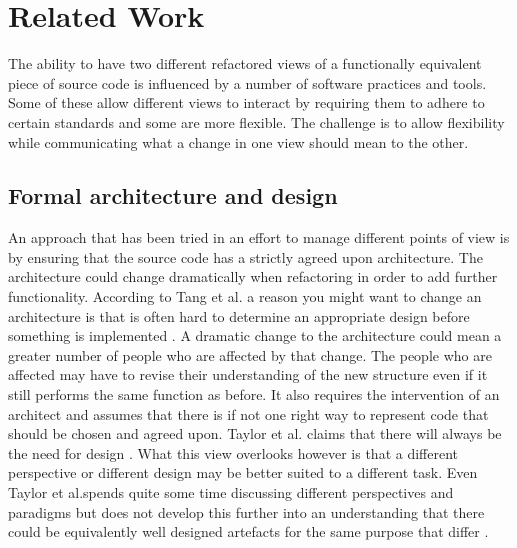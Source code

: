 \documentclass[12pt]{CRPITStyle}
\renewcommand{\cite}{\citep}
\begin{document}
\section{Related Work}
The ability to have two different refactored views of a functionally equivalent piece of source code is influenced by a number of software practices and tools. Some of these allow different views to interact by requiring them to adhere to certain standards and some are more flexible. The challenge is to allow flexibility while communicating what a change in one view should mean to the other. 

\subsection{Formal architecture and design}
An approach that has been tried in an effort to manage different points of view is by ensuring that the source code has a strictly agreed upon architecture. The architecture could change dramatically when refactoring in order to add further functionality. According to Tang et al. a reason you might want to change an architecture is that is often hard to determine an appropriate design before something is implemented \cite{Tang2009}. A dramatic change to the architecture could mean a greater number of people who are affected by that change. The people who are affected may have to revise their understanding of the new structure even if it still performs the same function as before. It also requires the intervention of an architect and assumes that there is if not one right way to represent code that should be chosen and agreed upon. Taylor et al. claims that there will always be the need for design \cite{Taylor2007}. What this view overlooks however is that a different perspective or different design may be better suited to a different task. Even Taylor et al.spends quite some time discussing different perspectives and paradigms but does not develop this further into an understanding that there could be equivalently well designed artefacts for the same purpose that differ \cite{Taylor2007}.
\end{document}
